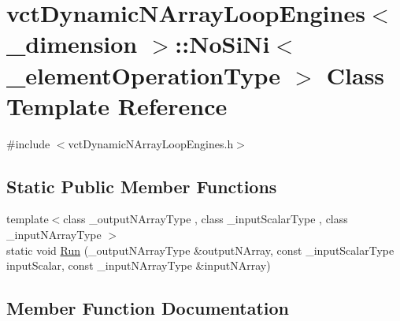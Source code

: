 \hypertarget{classvct_dynamic_n_array_loop_engines_1_1_no_si_ni}{}\section{vct\+Dynamic\+N\+Array\+Loop\+Engines$<$ \+\_\+dimension $>$\+:\+:No\+Si\+Ni$<$ \+\_\+element\+Operation\+Type $>$ Class Template Reference}
\label{classvct_dynamic_n_array_loop_engines_1_1_no_si_ni}


{\ttfamily \#include $<$vct\+Dynamic\+N\+Array\+Loop\+Engines.\+h$>$}

\subsection*{Static Public Member Functions}
\begin{DoxyCompactItemize}
\item 
{\footnotesize template$<$class \+\_\+output\+N\+Array\+Type , class \+\_\+input\+Scalar\+Type , class \+\_\+input\+N\+Array\+Type $>$ }\\static void \hyperlink{classvct_dynamic_n_array_loop_engines_1_1_no_si_ni_a02bfc764133bcb4f7da60823215929e7}{Run} (\+\_\+output\+N\+Array\+Type \&output\+N\+Array, const \+\_\+input\+Scalar\+Type input\+Scalar, const \+\_\+input\+N\+Array\+Type \&input\+N\+Array)
\end{DoxyCompactItemize}


\subsection{Member Function Documentation}
\hypertarget{classvct_dynamic_n_array_loop_engines_1_1_no_si_ni_a02bfc764133bcb4f7da60823215929e7}{}
